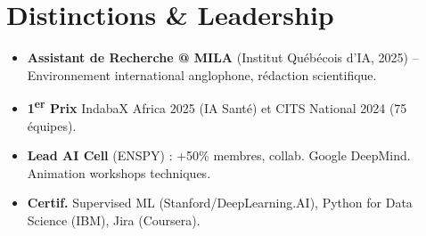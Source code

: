 \documentclass[a4paper,11pt]{article}
\begin{document}
\section{Distinctions \& Leadership}
\begin{itemize}[leftmargin=*, label=\tiny$\bullet$, nosep]
    \item \small{\textbf{Assistant de Recherche @ MILA} (Institut Québécois d'IA, 2025) -- Environnement international anglophone, rédaction scientifique.}
    \item \small{\textbf{1\textsuperscript{er} Prix} IndabaX Africa 2025 (IA Santé) et CITS National 2024 (75 équipes).}
    \item \small{\textbf{Lead AI Cell} (ENSPY) : +50\% membres, collab. Google DeepMind. Animation workshops techniques.}
    \item \small{\textbf{Certif.} Supervised ML (Stanford/DeepLearning.AI), Python for Data Science (IBM), Jira (Coursera).}
\end{itemize}
\end{document}
